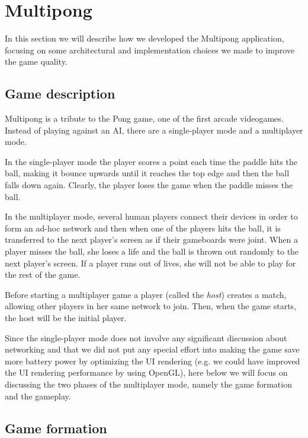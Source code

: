 \section{Multipong} %

In this section we will describe how we developed the Multipong application,
focusing on some architectural and implementation choices we made to improve
the game quality.

\subsection{Game description} %

Multipong is a tribute to the Pong game, one of the first arcade videogames.
Instead of playing against an AI, there are a single-player mode and a
multiplayer mode.

In the single-player mode the player scores a point each time the paddle hits
the ball, making it bounce upwards until it reaches the top edge and then the
ball falls down again. Clearly, the player loses the game when the paddle misses
the ball.

In the multiplayer mode, several human players connect their devices in order
to form an ad-hoc network and then when one of the players hits the ball, it is
transferred to the next player's screen as if their gameboards were joint.
When a player misses the ball, she loses a life and the ball is thrown out
randomly to the next player's screen.
If a player runs out of lives, she will not be able to play for the rest of the
game.

Before starting a multiplayer game a player (called the \textit{host}) creates
a match, allowing other players in her same network to join. Then, when the
game starts, the host will be the initial player.

Since the single-player mode does not involve any significant discussion about
networking and that we did not put any special effort into making the game save
more battery power by optimizing the UI rendering (e.g. we could have improved
the UI rendering performance by using OpenGL), here below we will focus on
discussing the two phases of the multiplayer mode, namely the game formation
and the gameplay.

\subsection{Game formation}

